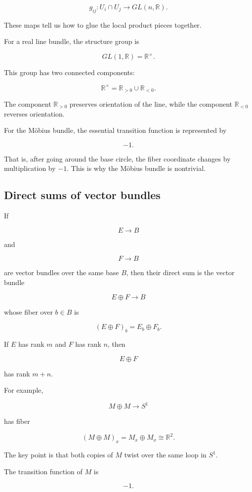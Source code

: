 \documentclass[12pt,a4paper]{article}
\newcommand{\R}{\mathbb{R}}
\theoremstyle{notespace}
\begin{document}
	\[
	g_{ij}:U_i\cap U_j\to GL(n,\R).
	\]
	
	These maps tell us how to glue the local product pieces together.
	
	For a real line bundle, the structure group is
	
	\[
	GL(1,\R)=\R^{\times}.
	\]
	
	This group has two connected components:
	
	\[
	\R^{\times}=\R_{>0}\cup \R_{<0}.
	\]
	
	The component \(\R_{>0}\) preserves orientation of the line, while the component \(\R_{<0}\) reverses orientation.
	
	For the M\"obius bundle, the essential transition function is represented by
	
	\[
	-1.
	\]
	
	That is, after going around the base circle, the fiber coordinate changes by multiplication by \(-1\). This is why the M\"obius bundle is nontrivial.
	
	\subsection{Direct sums of vector bundles}
	
	If
	
	\[
	E\to B
	\]
	
	and
	
	\[
	F\to B
	\]
	
	are vector bundles over the same base \(B\), then their direct sum is the vector bundle
	
	\[
	E\oplus F\to B
	\]
	
	whose fiber over \(b\in B\) is
	
	\[
	(E\oplus F)_b=E_b\oplus F_b.
	\]
	
	If \(E\) has rank \(m\) and \(F\) has rank \(n\), then
	
	\[
	E\oplus F
	\]
	
	has rank \(m+n\).
	
	For example,
	
	\[
	M\oplus M\to S^{1}
	\]
	
	has fiber
	
	\[
	(M\oplus M)_x=M_x\oplus M_x\cong \R^{2}.
	\]
	
	The key point is that both copies of \(M\) twist over the same loop in \(S^{1}\).
	
	The transition function of \(M\) is
	
	\[
	-1.
	\]
	
\end{document}
